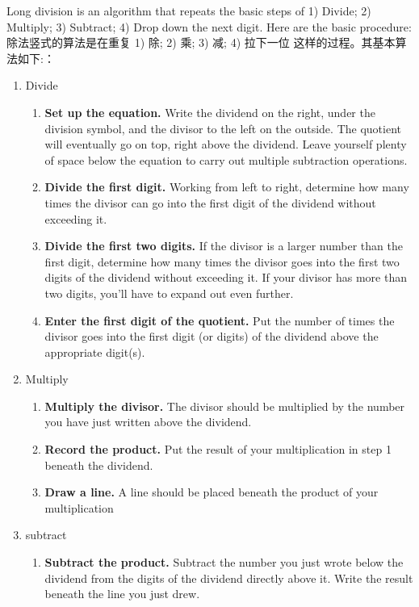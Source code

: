 \begin{paracol}{2}
Long division is an algorithm that repeats the basic steps of
1) Divide; 2) Multiply; 3) Subtract; 4) Drop down the next digit. Here are the basic procedure\cite{Longdiv}:
\switchcolumn[1]
除法竖式的算法是在重复 1) 除; 2) 乘; 3) 减; 4) 拉下一位 这样的过程。其基本算法如下\cite{Longdiv}:：
\end{paracol}

\begin{paracol}{2}
\begin{enumerate}
\item Divide
\begin{enumerate}
\item {\bf Set up the equation.} Write the dividend on the right, under the division symbol, and the divisor to the left on the outside. The quotient will eventually go on top, right above the dividend. Leave yourself plenty of space below the equation to carry out multiple subtraction operations.
\item {\bf Divide the first digit.} Working from left to right, determine how many times the divisor can go into the first digit of the dividend without exceeding it.
\item {\bf Divide the first two digits.} If the divisor is a larger number than the first digit, determine how many times the divisor goes into the first two digits of the dividend without exceeding it. If your divisor has more than two digits, you'll have to expand out even further.
\item {\bf Enter the first digit of the quotient.} Put the number of times the divisor goes into the first digit (or digits) of the dividend above the appropriate digit(s).
\end{enumerate}
\item Multiply
\begin{enumerate}
\item {\bf Multiply the divisor.} The divisor should be multiplied by the number you have just written above the dividend.
\item {\bf Record the product.} Put the result of your multiplication in step 1 beneath the dividend.
\item {\bf Draw a line.} A line should be placed beneath the product of your multiplication
\end{enumerate}
\item subtract
\begin{enumerate}
\item {\bf Subtract the product.} Subtract the number you just wrote below the dividend from the digits of the dividend directly above it. Write the result beneath the line you just drew.

\end{enumerate}
\end{enumerate}
\end{paracol}
